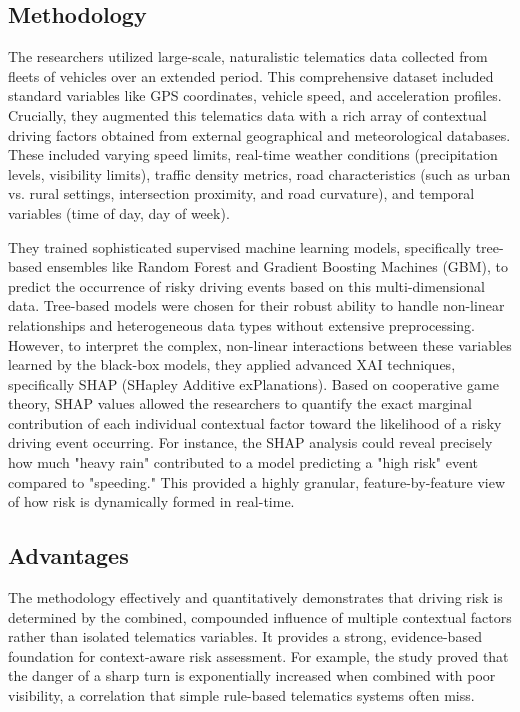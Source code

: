 \subsection{Methodology}
The researchers utilized large-scale, naturalistic telematics data collected from fleets of vehicles over an extended period. This comprehensive dataset included standard variables like GPS coordinates, vehicle speed, and acceleration profiles. Crucially, they augmented this telematics data with a rich array of contextual driving factors obtained from external geographical and meteorological databases. These included varying speed limits, real-time weather conditions (precipitation levels, visibility limits), traffic density metrics, road characteristics (such as urban vs. rural settings, intersection proximity, and road curvature), and temporal variables (time of day, day of week). 

They trained sophisticated supervised machine learning models, specifically tree-based ensembles like Random Forest and Gradient Boosting Machines (GBM), to predict the occurrence of risky driving events based on this multi-dimensional data. Tree-based models were chosen for their robust ability to handle non-linear relationships and heterogeneous data types without extensive preprocessing. However, to interpret the complex, non-linear interactions between these variables learned by the black-box models, they applied advanced XAI techniques, specifically SHAP (SHapley Additive exPlanations). Based on cooperative game theory, SHAP values allowed the researchers to quantify the exact marginal contribution of each individual contextual factor toward the likelihood of a risky driving event occurring. For instance, the SHAP analysis could reveal precisely how much "heavy rain" contributed to a model predicting a "high risk" event compared to "speeding." This provided a highly granular, feature-by-feature view of how risk is dynamically formed in real-time.

\subsection{Advantages}
The methodology effectively and quantitatively demonstrates that driving risk is determined by the combined, compounded influence of multiple contextual factors rather than isolated telematics variables. It provides a strong, evidence-based foundation for context-aware risk assessment. For example, the study proved that the danger of a sharp turn is exponentially increased when combined with poor visibility, a correlation that simple rule-based telematics systems often miss. 

